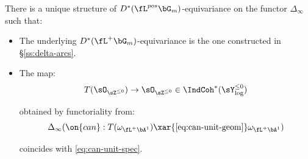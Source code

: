 \begin{prop}
\notready

There is a unique structure of
$D^*(\fL^{pos}\bG_m)$-equivariance on the functor $\Delta_{\infty}$
such that:

\begin{itemize}

\item The underlying $D^*(\fL^+\bG_m)$-equivariance is the one
constructed in \S \ref{ss:delta-arcs}.

\item The map:
%
\[
T(\sO_{\sZ^{\leq 0}}) \to \sO_{\sZ^{\leq 0}} \in \IndCoh^*(\sY_{\log}^{\leq 0})
\]

 obtained by functoriality from:
%
\[
\Delta_{\infty}(\on{can}:T(\omega_{\fL^+\bA^1}) \xar{\eqref{eq:can-unit-geom}}
\omega_{\fL^+\bA^1})
\]

 coincides with \eqref{eq:can-unit-spec}.

\end{itemize}

\end{prop}

